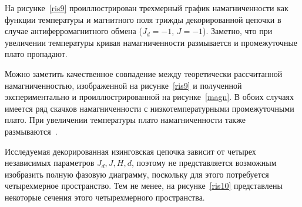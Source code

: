 

На рисунке~\ref{ris9} проиллюстрирован трехмерный график намагниченности как функции температуры и магнитного поля трижды декорированной цепочки в случае антиферромагнитного обмена ($J_d=-1$, $J=-1$). Заметно, что при увеличении температуры кривая намагниченности размывается и промежуточные плато пропадают. 

Можно заметить качественное совпадение между теоретически рассчитанной намагниченностью, изображенной на рисунке~\ref{ris9} и полученной экспериментально и проиллюстрированной на рисунке~\ref{magn}. В обоих случаях имеется ряд скачков намагниченности с низкотемпературными промежуточными плато. При увеличении температуры плато намагниченности также размываются~\cite{rossat1982}. 


Исследуемая декорированная изинговская цепочка зависит от четырех независимых параметров $J_d, J, H, d$, поэтому не представляется возможным изобразить полную фазовую диаграмму, поскольку для этого потребуется четырехмерное пространство. Тем не менее, на рисунке~\ref{ris10} представлены некоторые сечения этого четырехмерного пространства.

